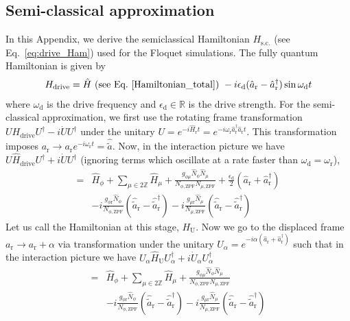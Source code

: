 \documentclass[%
reprint,
superscriptaddress,
 amsmath,amssymb,
 aps,
 prx,
longbibliography,
floatfix,
]{revtex4-2}
\begin{document}
{\subsection{Semi-classical approximation}\label{app:semi-classical}
In this Appendix, we derive the semiclassical Hamiltonian $H_\textrm{s.c.}$ (see Eq.~\ref{eq:drive_Ham}) used for the Floquet simulations. The fully quantum Hamiltonian is given by 
\begin{align}
    H_\textrm{drive}=\hat H \textrm{ (see Eq.~\ref{Hamiltonian_total}) }-i\epsilon_\textrm{d}(\hat a_\textrm{r}-\hat a_\textrm{r}^\dagger)\sin{\omega_\textrm{d} t}
\end{align}
where $\omega_\textrm{d}$ is the drive frequency and $\epsilon_\textrm{d}\in \mathbb{R}$ is the drive strength. For the semi-classical approximation, we first use the rotating frame transformation $UH_\textrm{drive}U^\dagger-i\dot{U}U^\dagger$ under the unitary $U=e^{-i\hat H_\textrm{r}t}=e^{-i\omega_\textrm{r} \hat a_\textrm{r}^\dagger \hat a_\textrm{r}t}$. This transformation imposes $a_\textrm{r}\rightarrow a_\textrm{r}e^{-i\omega_\textrm{r}t}=\hat{\tilde{a}}$. Now, in the interaction picture we have $U\hat H_\textrm{drive}U^\dagger+i\dot{U}U^\dagger$ (ignoring terms which oscillate at a rate faster than $\omega_\textrm{d}=\omega_\textrm{r}$),
\begin{align}
   =&\hat H_\phi+\sum_{\mu\in 2\mathbb{Z}}\hat H_\mu+\frac{g_{\phi\mu}\hat N_\phi\hat N_\mu}{N_{\phi,\textrm{ZPF}}N_{\mu,\textrm{ZPF}}}+\frac{\epsilon_\textrm{d}}{2}(\hat a_\textrm{r}+\hat a_\textrm{r}^\dagger)\nonumber\\ 
   &-i\frac{g_{\phi\textrm{r}}\hat N_\phi}{N_{\phi,\textrm{ZPF}}}(\hat {\tilde{a}}_\textrm{r}-\hat {\tilde{a}}_\textrm{r}^\dagger)-i\frac{g_{\mu\textrm{r}}\hat N_\mu}{N_{\mu,\textrm{ZPF}}}(\hat {\tilde{a}}_\textrm{r}-\hat {\tilde{a}}_\textrm{r}^\dagger)
\end{align}
Let us call the Hamiltonian at this stage, $H_\textrm{U}$. Now we go to the displaced frame $a_\textrm{r}\rightarrow a_\textrm{r}+\alpha$ via transformation under the unitary $U_\alpha=e^{-i\alpha(\hat a_\textrm{r}+\hat a_\textrm{r}^\dagger)}$ such that in the interaction picture we have $ U_\alpha\hat H_\textrm{U}U_\alpha^\dagger+i\dot{U}_\alpha U_\alpha^\dagger$ 
\begin{align}
   =&\hat H_\phi+\sum_{\mu\in 2\mathbb{Z}}\hat H_\mu+\frac{g_{\phi\mu}\hat N_\phi\hat N_\mu}{N_{\phi,\textrm{ZPF}}N_{\mu,\textrm{ZPF}}}\label{bare}\\ 
   &-i\frac{g_{\phi\textrm{r}}\hat N_\phi}{N_{\phi,\textrm{ZPF}}}(\hat {\tilde{a}}_\textrm{r}-\hat {\tilde{a}}_\textrm{r}^\dagger)-i\frac{g_{\mu\textrm{r}}\hat N_\mu}{N_{\mu,\textrm{ZPF}}}(\hat {\tilde{a}}_\textrm{r}-\hat {\tilde{a}}_\textrm{r}^\dagger)\label{quantum}\\

\end{align}}
\end{document}
